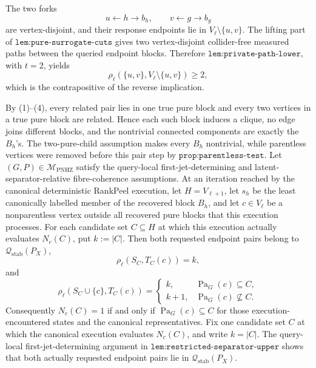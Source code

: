 The two forks
\[
 u\leftarrow h\to b_h,
 \qquad
 v\leftarrow g\to b_g \tag{3}
\]
are vertex-disjoint, and their response endpoints lie in \(V_\ell\setminus\{u,v\}\).  The lifting part of \(\texttt{lem:pure-surrogate-cuts}\) gives two vertex-disjoint collider-free measured paths between the queried endpoint blocks.  Therefore \(\texttt{lem:private-path-lower}\), with \(t=2\), yields
\[
 \rho_\ell(\{u,v\},V_\ell\setminus\{u,v\})\geq2, \tag{4}
\]
which is the contrapositive of the reverse implication.

By (1)--(4), every related pair lies in one true pure block and every two vertices in a true pure block are related.  Hence each such block induces a clique, no edge joins different blocks, and the nontrivial connected components are exactly the \(B_h\)'s.  The two-pure-child assumption makes every \(B_h\) nontrivial, while parentless vertices were removed before this pair step by \(\texttt{prop:parentless-test}\).
Let \((G,P)\in\mathcal M_{\mathrm{PNHZ}}\) satisfy the query-local first-jet-determining and latent-separator-relative fibre-coherence assumptions.  At an iteration reached by the canonical deterministic RankPeel execution, let \(H=V_{\ell+1}\), let \(s_h\) be the least canonically labelled member of the recovered block \(B_h\), and let \(c\in V_\ell\) be a nonparentless vertex outside all recovered pure blocks that this execution processes.  For each candidate set \(C\subseteq H\) at which this execution actually evaluates \(N_c(C)\), put \(k:=|C|\).  Then both requested endpoint pairs belong to \(\mathcal Q_{\mathrm{stab}}(P_X)\),
\[
 \rho_\ell(S_C,T_C(c))=k,
\]
and
\[
 \rho_\ell(S_C\cup\{c\},T_C(c))=
 \begin{cases}
 k,&\operatorname{Pa}_G(c)\subseteq C,\\
 k+1,&\operatorname{Pa}_G(c)\nsubseteq C.
 \end{cases}
\]
Consequently \(N_c(C)=1\) if and only if \(\operatorname{Pa}_G(c)\subseteq C\) for those execution-encountered states and the canonical representatives.
Fix one candidate set \(C\) at which the canonical execution evaluates \(N_c(C)\), and write \(k=|C|\).  The query-local first-jet-determining argument in \(\texttt{lem:restricted-separator-upper}\) shows that both actually requested endpoint pairs lie in \(\mathcal Q_{\mathrm{stab}}(P_X)\).


